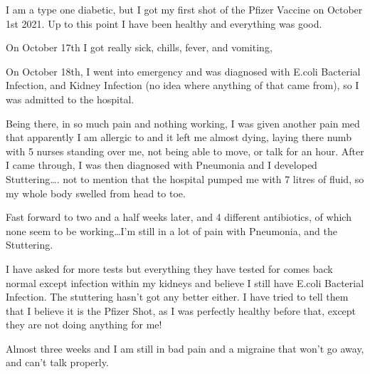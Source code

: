 I am a type one diabetic, but I got my first shot of the Pfizer Vaccine on
October 1st 2021. Up to this point I have been healthy and everything was good.

On October 17th I got really sick, chills, fever, and vomiting,

On October 18th, I went into emergency and was diagnosed with E.coli Bacterial
Infection, and Kidney Infection (no idea where anything of that came from), so I
was admitted to the hospital.

Being there, in so much pain and nothing working, I was given another pain med
that apparently I am allergic to and it left me almost dying, laying there numb
with 5 nurses standing over me, not being able to move, or talk for an
hour. After I came through, I was then diagnosed with Pneumonia and I developed
Stuttering…. not to mention that the hospital pumped me with 7 litres of fluid,
so my whole body swelled from head to toe.

Fast forward to two and a half weeks later, and 4 different antibiotics, of
which none seem to be working…I’m still in a lot of pain with Pneumonia, and the
Stuttering.

I have asked for more tests but everything they have tested for comes back
normal except infection within my kidneys and believe I still have E.coli
Bacterial Infection. The stuttering hasn’t got any better either. I have tried
to tell them that I believe it is the Pfizer Shot, as I was perfectly healthy
before that, except they are not doing anything for me!

Almost three weeks and I am still in bad pain and a migraine that won’t go away,
and can’t talk properly.
